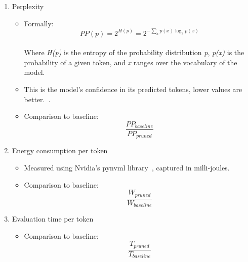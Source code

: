 \documentclass[conference]{IEEEtran}
\begin{document}
    \begin{enumerate}
        \item Perplexity
        \begin{itemize}
            \item Formally:
            \\
            \begin{equation}
                PP(p) = 2^{H(p)} = 2^{-\sum_x p(x) \log_2 p(x)}
                \label{eq:perplexity}
            \end{equation}
            \\
            Where \textit{H(p)} is the entropy of the probability distribution \textit{p}, \textit{p(x)} is the probability of a given token, and \textit{x} ranges over the vocabulary of the model.
            \item This is the model's confidence in its predicted tokens, lower values are better.~\cite{jelinek1977perplexity}.
            \item Comparison to baseline:
            \\
            \begin{equation}
                \frac{PP_{baseline}}{PP_{pruned}}
                \label{eq:perplexity_comparison}
            \end{equation}
        \end{itemize}
        \item Energy consumption per token
        \begin{itemize}
            \item Measured using Nvidia's pynvml library~\cite{pynvml}, captured in milli-joules.
            \item Comparison to baseline:
            \\
            \begin{equation}
                \frac{W_{pruned}}{W_{baseline}}
                \label{eq:energy_comparison}
            \end{equation}
        \end{itemize}
        \item Evaluation time per token
        \begin{itemize}
            \item Comparison to baseline:
            \\
            \begin{equation}
                \frac{T_{pruned}}{T_{baseline}}
                \label{eq:evaluation_time_comparison}
            \end{equation}

\end{itemize}
\end{enumerate}
\end{document}
